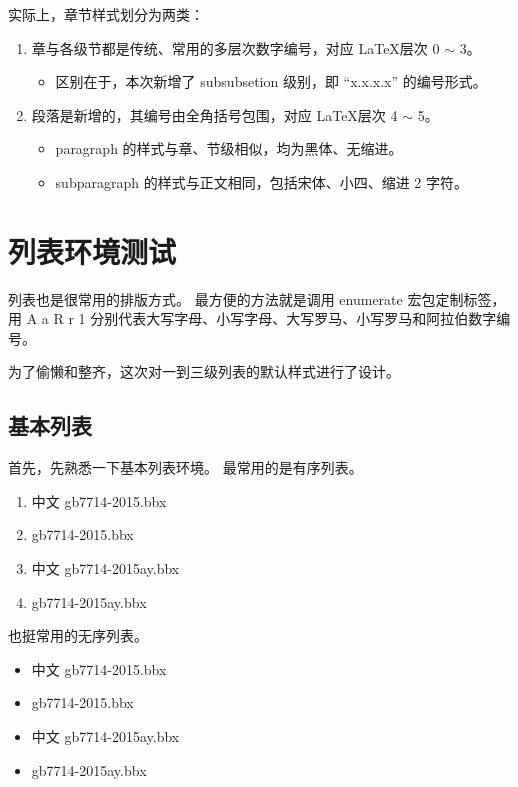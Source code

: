 \documentclass[../Main/thesis]{subfiles}
\begin{document}
实际上，章节样式划分为两类：
\begin{enumerate}[(1)]
  \item 章与各级节都是传统、常用的多层次数字编号，对应 \LaTeX 层次 0 $\sim$ 3。
  \begin{itemize}[\textbullet]
    \item 区别在于，本次新增了 subsubsetion 级别，即 “x.x.x.x” 的编号形式。
  \end{itemize}
  \item 段落是新增的，其编号由全角括号包围，对应 \LaTeX 层次 4 $\sim$ 5。
  \begin{itemize}[\textbullet]
    \item paragraph 的样式与章、节级相似，均为黑体、无缩进。
    \item subparagraph 的样式与正文相同，包括宋体、小四、缩进 2 字符。
  \end{itemize}
\end{enumerate}

\section{列表环境测试} \label{sec:list}

列表也是很常用的排版方式。
最方便的方法就是调用 enumerate 宏包定制标签，用 A a R r 1 分别代表大写字母、小写字母、大写罗马、小写罗马和阿拉伯数字编号。

为了偷懒和整齐，这次对一到三级列表的默认样式进行了设计。

\subsection{基本列表} \label{ssc:basiclist}

首先，先熟悉一下基本列表环境。
最常用的是有序列表。

\begin{enumerate}
  \item 中文 gb7714-2015.bbx
  \item gb7714-2015.bbx
  \item 中文 gb7714-2015ay.bbx
  \item gb7714-2015ay.bbx
\end{enumerate}

也挺常用的无序列表。

\begin{itemize}
  \item 中文 gb7714-2015.bbx
  \item gb7714-2015.bbx
  \item 中文 gb7714-2015ay.bbx
  \item gb7714-2015ay.bbx
\end{itemize}
\end{document}
